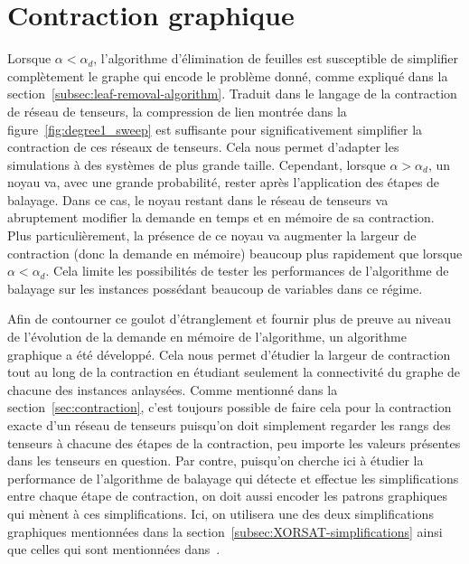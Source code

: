\chapter{Contraction graphique} \label{ch:graphical-method}
Lorsque $\alpha < \alpha_d$, l'algorithme d'élimination de feuilles est susceptible de simplifier complètement le graphe qui encode le problème donné, comme expliqué dans la section~\ref{subsec:leaf-removal-algorithm}.
Traduit dans le langage de la contraction de réseau de tenseurs, la compression de lien montrée dans la figure~\ref{fig:degree1_sweep} est suffisante pour significativement simplifier la contraction de ces réseaux de tenseurs.
Cela nous permet d'adapter les simulations à des systèmes de plus grande taille.
Cependant, lorsque $\alpha > \alpha_d$, un noyau va, avec une grande probabilité, rester après l'application des étapes de balayage.
Dans ce cas, le noyau restant dans le réseau de tenseurs va abruptement modifier la demande en temps et en mémoire de sa contraction.
Plus particulièrement, la présence de ce noyau va augmenter la largeur de contraction (donc la demande en mémoire) beaucoup plus rapidement que lorsque $\alpha < \alpha_d$.
Cela limite les possibilités de tester les performances de l'algorithme de balayage sur les instances possédant beaucoup de variables dans ce régime.

Afin de contourner ce goulot d'étranglement et fournir plus de preuve au niveau de l'évolution de la demande en mémoire de l'algorithme, un algorithme graphique a été développé.
Cela nous permet d'étudier la largeur de contraction tout au long de la contraction en étudiant seulement la connectivité du graphe de chacune des instances anlaysées.
Comme mentionné dans la section~\ref{sec:contraction}, c'est toujours possible de faire cela pour la contraction exacte d'un réseau de tenseurs puisqu'on doit simplement regarder les rangs des tenseurs à chacune des étapes de la contraction, peu importe les valeurs présentes dans les tenseurs en question.
Par contre, puisqu'on cherche ici à étudier la performance de l'algorithme de balayage qui détecte et effectue les simplifications entre chaque étape de contraction, on doit aussi encoder les patrons graphiques qui mènent à ces simplifications.
Ici, on utilisera une des deux simplifications graphiques mentionnées dans la section~\ref{subsec:XORSAT-simplifications} ainsi que celles qui sont mentionnées dans~\cite{denny_algebraically_2012}.


